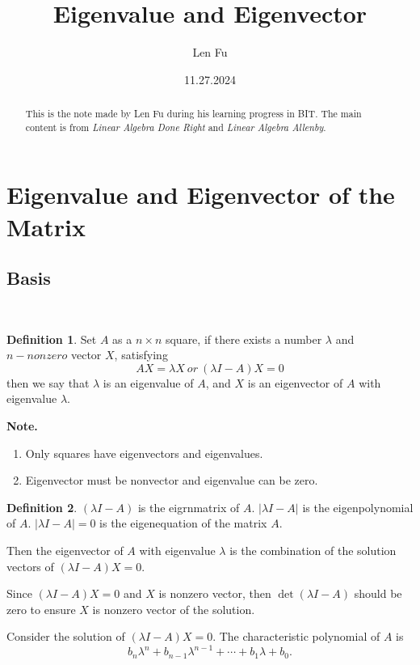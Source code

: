\documentclass{article}
\title{Eigenvalue and Eigenvector}
\author{Len Fu}
\date{11.27.2024}
\theoremstyle{definition}
\newtheorem{defi}{Definition}[section]
\begin{document}
\maketitle


\begin{abstract}
    This is the note made by Len Fu during his learning progress in BIT.
    The main content is from \textit{Linear Algebra Done Right} and \textit{Linear Algebra Allenby}.
\end{abstract}

\tableofcontents

\newpage

\section{Eigenvalue and Eigenvector of the Matrix}
\subsection{Basis}\
\begin{defi}
    Set $A$ as a $n\times n$ square, if there exists a 
    number $\lambda$ and $n-nonzero$ vector $X$, satisfying 
    $$AX=\lambda X\ or\ (\lambda I-A)X=0$$
    then we say that $\lambda$ is an eigenvalue of $A$, and
    $X$ is an eigenvector of $A$ with eigenvalue $\lambda$.
\end{defi}

\textbf{Note.}
\begin{enumerate}
    \item Only squares have eigenvectors and eigenvalues.
    \item Eigenvector must be nonvector and eigenvalue can be zero.
\end{enumerate}


\begin{defi}
    $(\lambda I-A)$ is the eigrnmatrix of $A$. $|\lambda I-A|$ is the eigenpolynomial of $A$.
    $|\lambda I-A|=0$ is the eigenequation of the matrix $A$.
\end{defi}

Then the eigenvector of $A$ with eigenvalue $\lambda$ is the combination of the solution vectors of $(\lambda I-A)X=0$.

Since $(\lambda I-A)X=0$ and $X$ is nonzero vector, then 
$\det (\lambda I-A)$ should be zero to ensure $X$ is nonzero vector of the solution.

Consider the solution of $(\lambda I-A)X=0$.
The characteristic polynomial of $A$ is 
$$b_{n}\lambda^{n}+b_{n-1}\lambda^{n-1}+\cdots+b_{1}\lambda+b_{0}.$$
\end{document}
